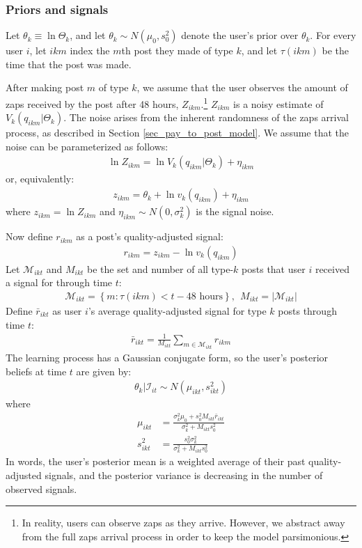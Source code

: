 \subsubsection*{Priors and signals}

Let $\theta_k \equiv \ln \Theta_k$, and let $\theta_k \sim N(\mu_0, s_0^2)$ denote the user's prior over $\theta_k$. For every user $i$, let $ikm$ index the $m$th post they made of type $k$, and let $\tau(ikm)$ be the time that the post was made.

After making post $m$ of type $k$, we assume that the user observes the amount of zaps received by the post after 48 hours, $Z_{ikm}$.\footnote{In reality, users can observe zaps as they arrive. However, we abstract away from the full zaps arrival process in order to keep the model parsimonious.}
$Z_{ikm}$ is a noisy estimate of $V_k(q_{ikm} | \Theta_k)$. The noise arises from the inherent randomness of the zaps arrival process, as described in Section \ref{sec_pay_to_post_model}. We assume that the noise can be parameterized as follows:
\begin{align}
\ln Z_{ikm} = \ln V_{k} (q_{ikm} | \Theta_k) + \eta_{ikm}
\end{align}
or, equivalently:
\begin{align}
z_{ikm} = \theta_k + \ln v_{k} (q_{ikm}) + \eta_{ikm}
\end{align}
where $z_{ikm} = \ln Z_{ikm}$ and $\eta_{ikm} \sim N(0, \sigma_{k}^2)$ is the signal noise.

Now define $r_{ikm}$ as a post's quality-adjusted signal:
\begin{align}
r_{ikm} = z_{ikm} - \ln v_k (q_{ikm}) 
\end{align}
Let $\mathcal{M}_{ikt}$ and $M_{ikt}$ be the set and number of all type-$k$ posts that user $i$ received a signal for through time $t$: 
\begin{align}
\mathcal{M}_{ikt} = \left\{ m: \tau(ikm) < t - \text{48 hours} \right\}, ~ 
~ M_{ikt} = \left| \mathcal{M}_{ikt} \right|
\end{align}
Define $\bar{r}_{ikt}$ as user $i$'s average quality-adjusted signal for type $k$ posts through time $t$:
\begin{align}
\bar{r}_{ikt} = \frac{1}{M_{ikt}} \sum_{m \in \mathcal{M}_{ikt}} r_{ikm}
\end{align}
The learning process has a Gaussian conjugate form, so the user's posterior beliefs at time $t$ are given by:
\begin{align}
\theta_k | \mathcal{I}_{it} \sim N(\mu_{ikt}, s_{ikt}^2)
\end{align}
where
\begin{align}
\mu_{ikt} &= \frac{\sigma_k^2 \mu_0 + s_0^2 M_{ikt} \bar{r}_{ikt}}{\sigma_k^2 + M_{ikt} s_0^2} \\
s_{ikt}^{2} &= \frac{s_0^2 \sigma_{k}^2}{ \sigma_k^2 + M_{ikt} s_0^2}
\end{align}
In words, the user's posterior mean is a weighted average of their past quality-adjusted signals, and the posterior variance is decreasing in the number of observed signals.

